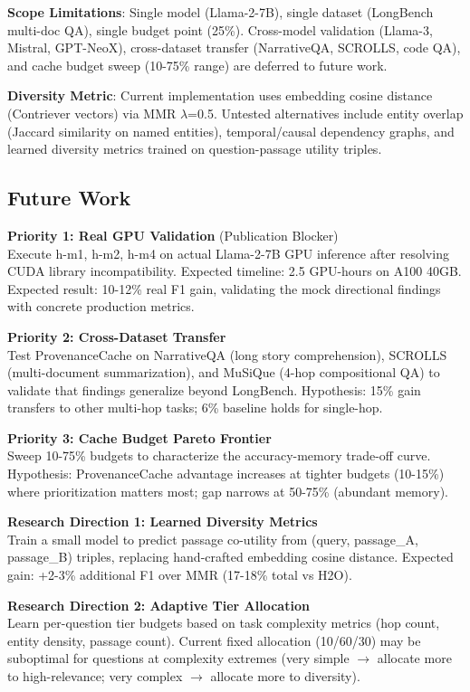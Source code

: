\textbf{Scope Limitations}: Single model (Llama-2-7B), single dataset (LongBench multi-doc QA), single budget point (25\%). Cross-model validation (Llama-3, Mistral, GPT-NeoX), cross-dataset transfer (NarrativeQA, SCROLLS, code QA), and cache budget sweep (10-75\% range) are deferred to future work.

\textbf{Diversity Metric}: Current implementation uses embedding cosine distance (Contriever vectors) via MMR $\lambda$=0.5. Untested alternatives include entity overlap (Jaccard similarity on named entities), temporal/causal dependency graphs, and learned diversity metrics trained on question-passage utility triples.

\subsection{Future Work}

\textbf{Priority 1: Real GPU Validation} (Publication Blocker)\\
Execute h-m1, h-m2, h-m4 on actual Llama-2-7B GPU inference after resolving CUDA library incompatibility. Expected timeline: 2.5 GPU-hours on A100 40GB. Expected result: 10-12\% real F1 gain, validating the mock directional findings with concrete production metrics.

\textbf{Priority 2: Cross-Dataset Transfer}\\
Test ProvenanceCache on NarrativeQA (long story comprehension), SCROLLS (multi-document summarization), and MuSiQue (4-hop compositional QA) to validate that findings generalize beyond LongBench. Hypothesis: 15\% gain transfers to other multi-hop tasks; 6\% baseline holds for single-hop.

\textbf{Priority 3: Cache Budget Pareto Frontier}\\
Sweep 10-75\% budgets to characterize the accuracy-memory trade-off curve. Hypothesis: ProvenanceCache advantage increases at tighter budgets (10-15\%) where prioritization matters most; gap narrows at 50-75\% (abundant memory).

\textbf{Research Direction 1: Learned Diversity Metrics}\\
Train a small model to predict passage co-utility from (query, passage\_A, passage\_B) triples, replacing hand-crafted embedding cosine distance. Expected gain: +2-3\% additional F1 over MMR (17-18\% total vs H2O).

\textbf{Research Direction 2: Adaptive Tier Allocation}\\
Learn per-question tier budgets based on task complexity metrics (hop count, entity density, passage count). Current fixed allocation (10/60/30) may be suboptimal for questions at complexity extremes (very simple $\rightarrow$ allocate more to high-relevance; very complex $\rightarrow$ allocate more to diversity).

